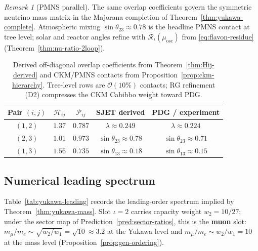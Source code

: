 \documentclass[aps,prd,onecolumn,amsmath,amssymb,nofootinbib,11pt]{revtex4-2}
\numberwithin{equation}{section}
\theoremstyle{plain}
\theoremstyle{definition}
\theoremstyle{remark}
\newtheorem{remark}[theorem]{Remark}
\begin{document}
\begin{remark}[PMNS parallel]
The same overlap coefficients govern the symmetric neutrino mass matrix in the
Majorana completion of Theorem~\ref{thm:yukawa-complete}. Atmospheric mixing
$\sin\theta_{23}\approx 0.78$ is the headline PMNS contact at tree level;
solar and reactor angles refine with $\mathcal{R}_\iota(\mu_{\mathrm{osc}})$
from \eqref{eq:flavon-residue} (Theorem~\ref{thm:nu-ratio-2loop}).
\end{remark}

\begin{table}[ht]
\centering
\small
\renewcommand{\arraystretch}{1.12}
\begin{tabular}{@{}ccccc@{}}
\toprule
\textbf{Pair $(i,j)$} & $\mathcal{H}_{ij}$ & $\mathcal{P}_{ij}$ &
SJET derived & PDG / experiment \\
\midrule
$(1,2)$ & $1.37$ & $0.787$ &
  $\lambda\approx 0.249$ &
  $\lambda\approx0.224$ \\
$(2,3)$ & $1.01$ & $0.973$ &
  $\sin\theta_{23}\approx 0.78$ &
  $\sin\theta_{23}\approx 0.71$ \\
$(1,3)$ & $1.56$ & $0.735$ &
  $\sin\theta_{13}\approx 0.18$ &
  $\sin\theta_{13}\approx 0.15$ \\
\bottomrule
\end{tabular}
\caption{Derived off-diagonal overlap coefficients from
Theorem~\ref{thm:Hij-derived} and CKM/PMNS contacts from
Proposition~\ref{prop:ckm-hierarchy}. Tree-level rows are
$\mathcal{O}(10\%)$ contacts; RG refinement (D2) compresses the CKM Cabibbo
weight toward PDG.}
\label{tab:Pij-ckm}
\end{table}

\subsection{Numerical leading spectrum}
\label{sec:yukawa:numerical}

Table~\ref{tab:yukawa-leading} records the leading-order spectrum implied by
Theorem~\ref{thm:yukawa-mass}. Slot $\iota=2$ carries capacity weight
$w_2=10/27$; under the sector map of Prediction~\ref{pred:sector-ratios},
this is the \textbf{muon} slot: $m_\mu/m_e\sim\sqrt{w_2/w_1}=\sqrt{10}\approx
3.2$ at the Yukawa level and $m_\mu/m_e\sim w_2/w_1=10$ at the mass level
(Proposition~\ref{prop:gen-ordering}).
\end{document}
